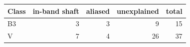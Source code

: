 \begin{tabular}{lrrrr}
\toprule
Class & in-band shaft & aliased & unexplained & total \\
\midrule
B3 & 3 & 3 & 9 & 15 \\
V & 7 & 4 & 26 & 37 \\
\bottomrule
\end{tabular}

